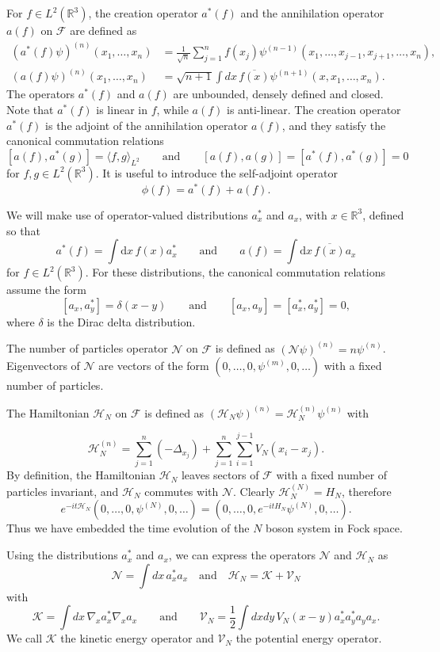 \documentclass[11pt,a4paper,DIV11]{scrartcl}	%
\newcommand{\R}{\mathds{R}}
\newcommand{\N}{\mathcal{N}}
\newcommand{\K}{\mathcal{K}}
\newcommand{\fock}{\mathcal{F}}		%
\newcommand{\di}{\textrm{d}}		%
\newcommand{\Hcal}{\mathcal{H}}		%
\newcommand{\cc}[1]{\overline{#1}}	%
\newcommand{\todo}[1]{}
\begin{document}
For $f \in L^2(\R^3)$, the creation operator $a^*(f)$ and the annihilation
operator $a(f)$ on $\mathcal{F}$ are defined as
\[
  \begin{split}
    (a^*(f) \psi)^{(n)}(x_1, \dots, x_n) & = \frac{1}{\sqrt{n}} \sum_{j=1}^n
    f(x_j) \psi^{(n-1)}(x_1, \dots, x_{j-1}, x_{j+1}, \dots, x_n), \\
    (a(f) \psi)^{(n)}(x_1, \dots, x_n) & = \sqrt{n+1} \int dx \,
    \overline{f(x)} \psi^{(n+1)}(x, x_1, \dots, x_n).
  \end{split}
\]
The operators $a^*(f)$ and $a(f)$ are unbounded, densely defined and closed.
Note that $a^*(f)$ is linear in $f$, while $a(f)$ is anti-linear. The creation
operator $a^*(f)$ is the adjoint of the annihilation operator $a(f)$, and
they satisfy the canonical commutation relations
\[
  [a(f), a^*(g)] = \langle f, g \rangle_{L^2} \qquad \text{and} \qquad [a(f),
  a(g)] = [a^*(f), a^*(g)] = 0
\]
for $f,g \in L^2(\R^3)$. It is useful to introduce the self-adjoint operator
\[
  \phi(f) = a^*(f) + a(f).
\]


We will make use of operator-valued distributions $a_x^*$ and $a_x$, with $x
\in \R^3$, defined so that
\[
  a^*(f) = \int \di x\, f(x) a^*_x \qquad \text{and} \qquad a(f) = \int \di
  x\, \cc{f(x)} a_x
\]
for $f \in L^2(\R^3)$. For these distributions, the canonical commutation
relations assume the form
\[
  [a_x, a_y^*] = \delta(x-y) \qquad \text{and} \qquad [a_x, a_y] = [a_x^*,
  a_y^*] = 0,
\]
where $\delta$ is the Dirac delta distribution.


The number of particles operator $\mathcal{N}$ on $\mathcal{F}$ is defined as
$(\N \psi)^{(n)} = n \psi^{(n)}$. Eigenvectors of $\N$ are vectors of the form
$(0, \dots, 0, \psi^{(m)}, 0, \dots )$ with a fixed number of particles.


The Hamiltonian $\Hcal_N$ on $\mathcal{F}$ is defined as $(\Hcal_N
\psi)^{(n)} = \Hcal_N^{(n)} \psi^{(n)}$ with
\todo{Double sum inconsistent with single sum in other places.}
\[
  \Hcal_N^{(n)} = \sum_{j=1}^n (-\Delta_{x_j}) + \sum_{j=1}^n
  \sum_{i=1}^{j-1} V_N(x_i - x_j).
\]
By definition, the Hamiltonian $\Hcal_N$ leaves sectors of $\fock$ with a
fixed number of particles invariant, and $\Hcal_N$ commutes with $\N$.
Clearly $\Hcal_N^{(N)} = H_N$, therefore
\[
e^{-it \Hcal_N} (0,\dots,0, \psi^{(N)},0,\dots) = (0,\dots,0,
e^{-itH_N}\psi^{(N)},0,\dots).
\]
Thus we have embedded the time evolution of the $N$ boson system in Fock space.

Using the distributions $a_x^*$ and $a_x$, we can express the operators $\N$
and $\Hcal_N$ as
\[
  \N = \int dx \, a_x^* a_x \quad \mbox{and} \quad
  \Hcal_N = \K + \mathcal{V}_N
\]
with
\[
  \K = \int dx \, \nabla_x a_x^* \nabla_x a_x \qquad \text{and} \qquad
  \mathcal{V}_N = \frac{1}{2} \int dx dy \, V_N(x-y) a_x^* a_y^* a_y a_x.
\]
We call $\K$ the kinetic energy operator and $\mathcal{V}_N$ the potential
energy operator.
\end{document}
